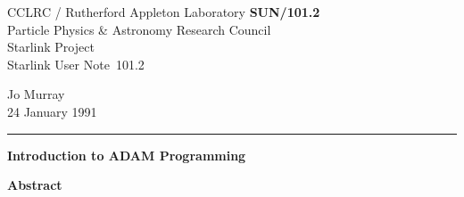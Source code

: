 \documentclass[twoside,11pt]{article}
\newcommand{\stardoccategory}  {Starlink User Note}
\newcommand{\stardocinitials}  {SUN}
\newcommand{\stardocnumber}    {101.2}
\newcommand{\stardocauthors}   {Jo Murray}
\newcommand{\stardocdate}      {24 January 1991}
\newcommand{\stardoctitle}     {Introduction to ADAM Programming}
\newcommand{\stardocname}{\stardocinitials /\stardocnumber}
\renewcommand{\_}{{\tt\char'137}}
\newenvironment{latexonly}{}{}
\begin{document}
\thispagestyle{empty}

\begin{latexonly}
   CCLRC / {\sc Rutherford Appleton Laboratory} \hfill {\bf \stardocname}\\
   {\large Particle Physics \& Astronomy Research Council}\\
   {\large Starlink Project\\}
   {\large \stardoccategory\ \stardocnumber}
   \begin{flushright}
   \stardocauthors\\
   \stardocdate
   \end{flushright}
   \vspace{-4mm}
   \rule{\textwidth}{0.5mm}
   \vspace{5mm}
   \begin{center}
   {\Huge\bf  \stardoctitle}
   \end{center}
   \vspace{5mm}

   \vspace{10mm}
   \begin{center}
      {\Large\bf Abstract}
   \end{center}
\end{latexonly}
\end{document}
